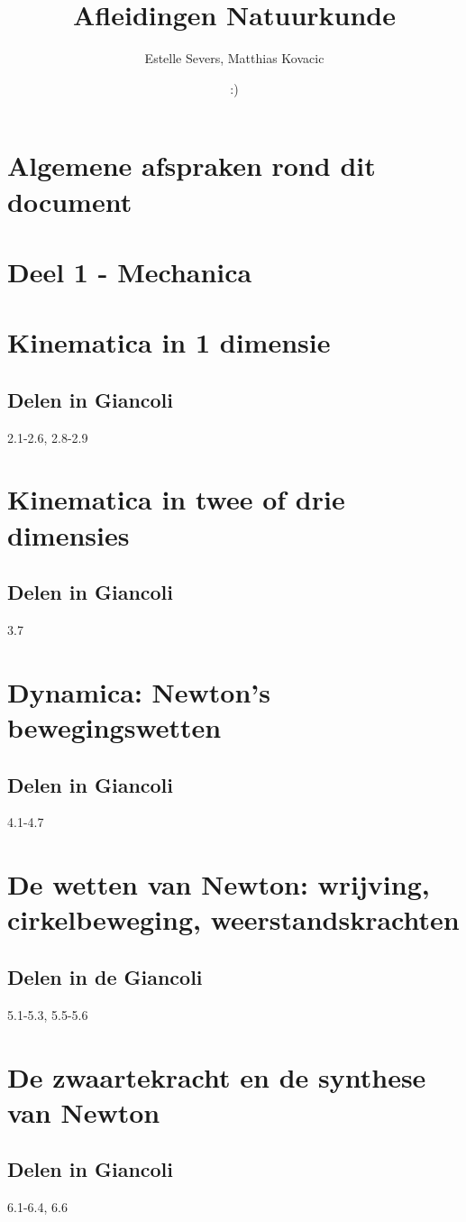 \documentclass[12pt,a4paper]{article}
\author{Estelle Severs, Matthias Kovacic}
\title{Afleidingen Natuurkunde}
\date{:)}
\begin{document}
	\maketitle
	\tableofcontents
	\newpage
	\section{Algemene afspraken rond dit document}
	\newpage
	\section{Deel 1 - Mechanica}
	\section{Kinematica in 1 dimensie}
	\subsection{Delen in Giancoli}
	2.1-2.6, 2.8-2.9
	\section{Kinematica in twee of drie dimensies}
	\subsection{Delen in Giancoli}
	3.7
	\section{Dynamica: Newton's bewegingswetten}
	\subsection{Delen in Giancoli}
	4.1-4.7
	\section{De wetten van Newton: wrijving, cirkelbeweging, weerstandskrachten}
	\subsection{Delen in de Giancoli}
	5.1-5.3, 5.5-5.6
	\section{De zwaartekracht en de synthese van Newton}
	\subsection{Delen in Giancoli}
	6.1-6.4, 6.6
\end{document}
